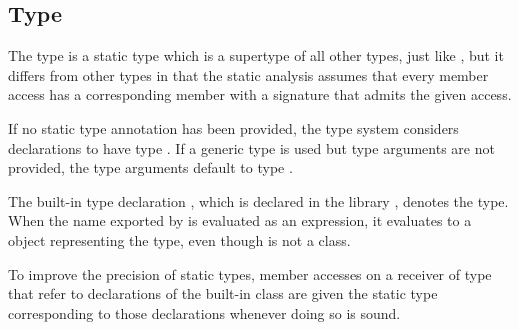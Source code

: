 \documentclass[makeidx]{article}
\begin{document}
{\subsection{Type \DYNAMIC}

\LMHash{}%
The type \DYNAMIC{} is a static type which is a supertype of all other types,
just like ,
but it differs from other types in that the static analysis
assumes that every member access has a corresponding member
with a signature that admits the given access.


\LMHash{}%
If no static type annotation has been provided,
the type system considers declarations to have type \DYNAMIC.
If a generic type is used but type arguments are not provided,
the type arguments default to type \DYNAMIC.


\LMHash{}%
The built-in type declaration ,
which is declared in the library ,
denotes the \DYNAMIC{} type.
When the name \DYNAMIC{} exported by  is evaluated
as an expression,
it evaluates to a  object representing the \DYNAMIC{} type,
even though \DYNAMIC{} is not a class.


\LMHash{}%
To improve the precision of static types,
member accesses on a receiver of type \DYNAMIC{} that refer to
declarations of the built-in class 
are given the static type corresponding to those declarations
whenever doing so is sound.

}
\end{document}
